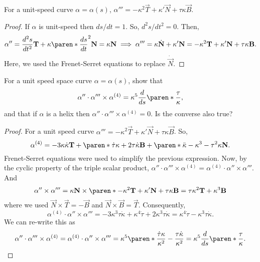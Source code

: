 \documentclass[11pt]{penrose}
\newcommand{\vT}{\vec{T}}
\newcommand{\vN}{\vec{N}}
\newcommand{\vB}{\vec{B}}
\begin{document}
\begin{nthm}
    For a unit-speed curve $\alpha = \alpha(s)$, $\alpha''' = -\kappa^2 \vT + \kappa' \vN + \tau\kappa \vB$.
\end{nthm}
\begin{proof}
    If $\alpha$ is unit-speed then $ds/dt = 1$. So, $d^2 s / dt^2 = 0$. Then,
    \begin{equation}
        \alpha''
        = \frac{d^2 s}{dt^2} \vT + \kappa \paren*{\frac{ds}{dt}}^2 \vN
        = \kappa\vN
        \implies 
        \alpha'''
        = \kappa \dot{\vN} + \kappa' \vN
        = -\kappa^2 \vT + \kappa' \vN + \tau\kappa \vB.
    \end{equation}
    Here, we used the Frenet-Serret equations to replace $\dot{\vN}$.
\end{proof}

\begin{nthm}
    For a unit speed space curve $\alpha = \alpha(s)$, show that
    \begin{equation}
        \alpha'' \cdot \alpha''' \times \alpha^{(4)} = \kappa^5 \frac{d}{ds}\paren*{\frac{\tau}{\kappa}},
    \end{equation}
    and that if $\alpha$ is a helix then $\alpha'' \cdot \alpha''' \times \alpha^{(4)} = 0$. Is the converse also true?
\end{nthm}
\begin{proof}
    For a unit speed curve $\alpha''' = -\kappa^2 \vT + \kappa' \vN + \tau\kappa \vB$. So,
    \begin{equation}
        \alpha^{(4)}
        = -3\kappa\dot{\kappa} \vT
        + \paren*{\dot{\tau}\kappa + 2\tau\dot{\kappa}} \vB
        + \paren*{\ddot{\kappa} - \kappa^3 - \tau^2 \kappa} \vN.
    \end{equation}
    Frenet-Serret equations were used to simplify the previous expression. Now, by the cyclic property of the triple scalar product, $\alpha'' \cdot \alpha''' \times \alpha^{(4)} = \alpha^{(4)} \cdot \alpha'' \times \alpha'''$. And
    \begin{equation}
        \alpha'' \times \alpha'''
        = \kappa\vN \times \paren*{-\kappa^2 \vT + \kappa' \vN + \tau\kappa \vB}
        = \tau \kappa^2 \vT + \kappa^3 \vB
    \end{equation}
    where we used $\vN \times \vT = - \vB$ and $\vN \times \vB = \vT$. Consequently,
    \begin{equation}
        \alpha^{(4)} \cdot \alpha'' \times \alpha'''
        = -3 \kappa^3 \tau \dot{\kappa} + \kappa^4 \dot{\tau} + 2 \kappa^3 \tau \dot{\kappa}
        = \kappa^4 \dot{\tau} - \kappa^3 \tau \dot{\kappa}.
    \end{equation}
    We can re-write this as
    \begin{equation}
        \alpha'' \cdot \alpha''' \times \alpha^{(4)}
        = \alpha^{(4)} \cdot \alpha'' \times \alpha'''
        = \kappa^5 \paren*{ \frac{\dot{\tau} \kappa}{\kappa^2} - \frac{\tau \dot{\kappa}}{\kappa^2} }
        = \kappa^5 \frac{d}{ds}\paren*{\frac{\tau}{\kappa}}.
        \qedhere
    \end{equation}
\end{proof}
\end{document}
